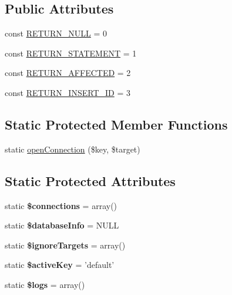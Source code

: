 \subsection*{Public Attributes}
\begin{DoxyCompactItemize}
\item 
const \hyperlink{classDatabase_ae00484bf91c4447fc1b391408f7cfbd3}{RETURN\_\-NULL} = 0
\item 
const \hyperlink{classDatabase_a7b7c6f8f81159b97752412e439d957dc}{RETURN\_\-STATEMENT} = 1
\item 
const \hyperlink{classDatabase_a557879c7732a573ed395f9196afeb898}{RETURN\_\-AFFECTED} = 2
\item 
const \hyperlink{classDatabase_a56dab08fbf70f81aaf6f55a71922f4ef}{RETURN\_\-INSERT\_\-ID} = 3
\end{DoxyCompactItemize}
\subsection*{Static Protected Member Functions}
\begin{DoxyCompactItemize}
\item 
static \hyperlink{classDatabase_a40724407e492d149e9b45e7d5e90ec37}{openConnection} (\$key, \$target)
\end{DoxyCompactItemize}
\subsection*{Static Protected Attributes}
\begin{DoxyCompactItemize}
\item 
\hypertarget{classDatabase_a5b3475f4078edb1c0629ddcc00901ec7}{
static {\bfseries \$connections} = array()}
\label{classDatabase_a5b3475f4078edb1c0629ddcc00901ec7}

\item 
\hypertarget{classDatabase_a0c015937446b53480050a687608fc09b}{
static {\bfseries \$databaseInfo} = NULL}
\label{classDatabase_a0c015937446b53480050a687608fc09b}

\item 
\hypertarget{classDatabase_a835e96936183cb872b1dce649e11ba41}{
static {\bfseries \$ignoreTargets} = array()}
\label{classDatabase_a835e96936183cb872b1dce649e11ba41}

\item 
\hypertarget{classDatabase_a96a67e90069e624c96c59e6c7f7a95d7}{
static {\bfseries \$activeKey} = 'default'}
\label{classDatabase_a96a67e90069e624c96c59e6c7f7a95d7}

\item 
\hypertarget{classDatabase_aad829292749f9df6fa49b9dbe38882e3}{
static {\bfseries \$logs} = array()}
\label{classDatabase_aad829292749f9df6fa49b9dbe38882e3}

\end{DoxyCompactItemize}


